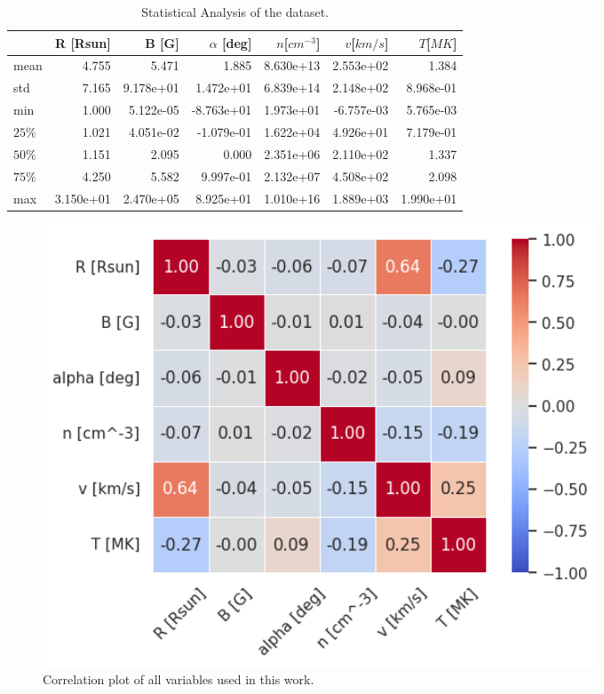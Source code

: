 \begin{table}[]
    \caption{Statistical Analysis of the dataset.}
    \label{tab:data_stats}
    \begin{tabular}{@{}lrrrrrr@{}}
    \toprule
           & R {[}Rsun{]} & B {[}G{]} & $\alpha$ {[}deg{]} & $n${[}$cm^{-3}${]} & $v${[}$km/s${]} & $T${[}$MK${]} \\ \midrule
    mean   & 4.755        & 5.471     & 1.885              & 8.630e+13 & 2.553e+02  & 1.384     \\
    std    & 7.165        & 9.178e+01 & 1.472e+01          & 6.839e+14 & 2.148e+02  & 8.968e-01 \\
    min    & 1.000        & 5.122e-05 & -8.763e+01         & 1.973e+01 & -6.757e-03 & 5.765e-03 \\
    $25\%$ & 1.021        & 4.051e-02 & -1.079e-01         & 1.622e+04 & 4.926e+01  & 7.179e-01 \\
    $50\%$ & 1.151        & 2.095     & 0.000              & 2.351e+06 & 2.110e+02  & 1.337     \\
    $75\%$ & 4.250        & 5.582     & 9.997e-01          & 2.132e+07 & 4.508e+02  & 2.098     \\
    max    & 3.150e+01    & 2.470e+05 & 8.925e+01          & 1.010e+16 & 1.889e+03  & 1.990e+01 \\ \bottomrule
    \end{tabular}
    \end{table}


\begin{figure}[]
    \centering
    \includegraphics[width=0.8\textwidth]{figures/variables_corrplot.png}
    \caption{Correlation plot of all variables used in this work.}
    \label{fig:corrplot}
\end{figure}

